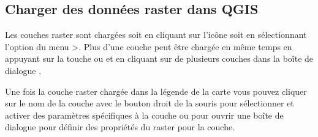 \subsection{Charger des données raster dans QGIS}\label{label_loadraster}

Les couches raster sont chargées soit en cliquant sur l'icône
 soit en
sélectionnant l'option du menu
>. Plus d'une couche peut être chargée en même temps en appuyant
sur la touche  ou  et en cliquant sur de
plusieurs couches dans la boîte de dialogue .

Une fois la couche raster chargée dans la légende de la carte vous pouvez
cliquer sur le nom de la couche avec le bouton droit de la souris pour
sélectionner et activer des paramètres spécifiques à la couche ou pour ouvrir
une boîte de dialogue pour définir des propriétés du raster pour la couche.


